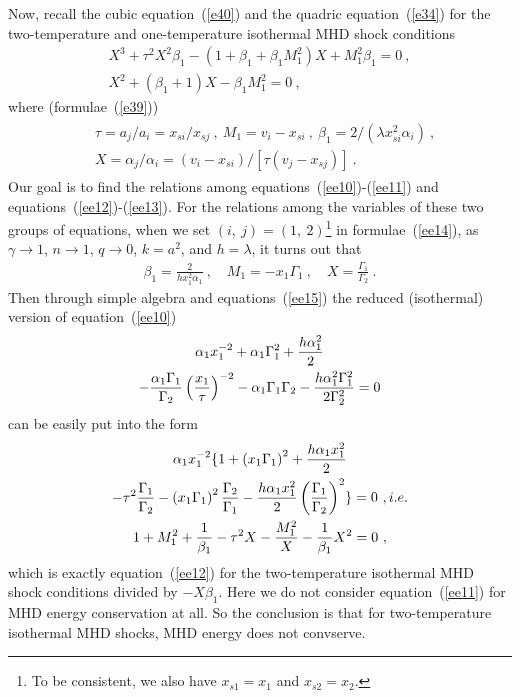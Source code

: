 \documentclass[fleqn,usenatbib]{mnras}
\begin{document}
Now, recall the cubic equation~(\ref{e40}) and the quadric equation~(\ref{e34}) for the two-temperature and one-temperature isothermal MHD shock conditions
\begin{gather}
X^{3}+\tau^{2}X^{2}\beta_{1}-\left(1+\beta_{1}+\beta_{1}M_{1}^{2}\right)X+M_{1}^{2}\beta_{1}=0\ ,\label{ee12}\\
X^{2}+\left(\beta_{1}+1\right)X-\beta_{1}M_{1}^{2}=0\ ,\label{ee13}
\end{gather}
where (formulae~(\ref{e39}))
\begin{gather}
\begin{split}
&\tau=a_{j}/a_{i}=x_{si}/x_{sj}\ ,
\ M_{1}=v_{i}-x_{si}\ ,
\ \beta_{1}=2/(\lambda x^{2}_{si}\alpha_{i})\ ,\\
&X=\alpha_{j}/\alpha_{i}=(v_{i}-x_{si})/[\tau (v_{j}-x_{sj})]\ .
\end{split}\label{ee14}
\end{gather}
Our goal is to find the relations among equations~(\ref{ee10})-(\ref{ee11}) and equations~(\ref{ee12})-(\ref{ee13}). For the relations among the variables of these two groups of equations, when we set $(i,\ j)=(1,\ 2)$\footnote{To be consistent, we also have $x_{s1}=x_{1}$ and $x_{s2}=x_{2}$.} in formulae~(\ref{ee14}), as $\gamma\rightarrow 1$, $n\rightarrow 1$, $q\rightarrow 0$, $k=a^{2}$, and $h=\lambda$, it turns out that
\begin{gather}
\beta_{1}=\frac{2}{hx_{1}^{2}\alpha_{1}}\ ,\quad M_{1}=-x_{1}\Gamma_{1}\ ,\quad X=\frac{\Gamma_{1}}{\Gamma_{2}}\ .\label{ee15}
\end{gather}
Then through simple algebra and equations~(\ref{ee15}) the reduced (isothermal) version of equation~(\ref{ee10})
\begin{gather}
\alpha_{1}x_{1}^{-2}+\alpha_{1}\Gamma_{1}^{2}+\frac{h\alpha_{1}^{2}}{2}\notag\\
-\frac{\alpha_{1}\Gamma_{1}}{\Gamma_{2}}\left(\frac{x_{1}}{\tau}\right)^{-2}-\alpha_{1}\Gamma_{1}\Gamma_{2}-\frac{h\alpha_{1}^{2}\Gamma_{1}^{2}}{2\Gamma_{2}^{2}}=0 \label{ee16}
\end{gather}
can be easily put into the form
\begin{gather}
\alpha_{1}x_{1}^{-2}\lbrace 1+\left(x_{1}\Gamma_{1}\right)^{2}+\frac{h\alpha_{1}x_{1}^{2}}{2}\notag\\
-\tau^{2}\frac{\Gamma_{1}}{\Gamma_{2}}-\left(x_{1}\Gamma_{1}\right)^{2}\frac{\Gamma_{2}}{\Gamma_{1}}-\frac{h\alpha_{1}x_{1}^{2}}{2}\left(\frac{\Gamma_{1}}{\Gamma_{2}}\right)^{2}\rbrace=0\ ,i.e.\notag\\
1+M_{1}^{2}+\frac{1}{\beta_{1}}-\tau^{2}X-\frac{M_{1}^{2}}{X}-\frac{1}{\beta_{1}}X^{2}=0\ ,\label{ee17}
\end{gather}
which is exactly equation~(\ref{ee12}) for the two-temperature isothermal MHD shock conditions divided by $-X\beta_{1}$. Here we do not consider equation~(\ref{ee11}) for MHD energy conservation at all. So the conclusion is that for two-temperature isothermal MHD shocks, MHD energy does not convserve.
\end{document}
